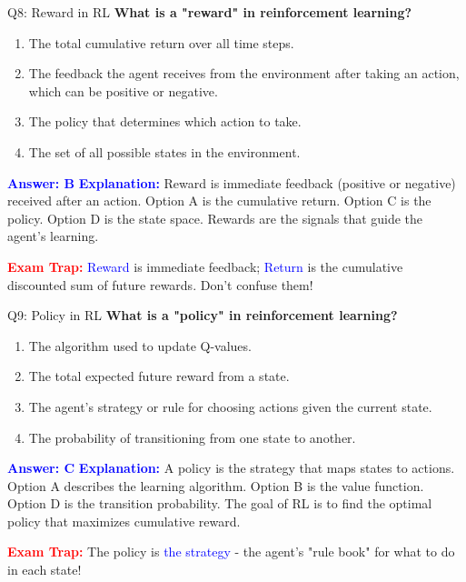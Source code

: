 \documentclass[8pt]{beamer}
\begin{document}
	\begin{frame}{Q8: Reward in RL}
		\fontsize{6.5}{7.5}\selectfont
		\textbf{What is a "reward" in reinforcement learning?}
		
		\begin{enumerate}
			\item The total cumulative return over all time steps.
			\item The feedback the agent receives from the environment after taking an action, which can be positive or negative.
			\item The policy that determines which action to take.
			\item The set of all possible states in the environment.
		\end{enumerate}
		
		\vspace{0.1cm}
		\textcolor{blue}{\textbf{Answer: B}}
		\vspace{0.1cm}
		\textcolor{blue}{\textbf{Explanation:}} Reward is immediate feedback (positive or negative) received after an action. Option A is the cumulative return. Option C is the policy. Option D is the state space. Rewards are the signals that guide the agent's learning.
		
		\textcolor{red}{\textbf{Exam Trap:}} \textcolor{blue}{Reward} is immediate feedback; \textcolor{blue}{Return} is the cumulative discounted sum of future rewards. Don't confuse them!
	\end{frame}
	
	\begin{frame}{Q9: Policy in RL}
		\fontsize{6.5}{7.5}\selectfont
		\textbf{What is a "policy" in reinforcement learning?}
		
		\begin{enumerate}
			\item The algorithm used to update Q-values.
			\item The total expected future reward from a state.
			\item The agent's strategy or rule for choosing actions given the current state.
			\item The probability of transitioning from one state to another.
		\end{enumerate}
		
		\vspace{0.1cm}
		\textcolor{blue}{\textbf{Answer: C}}
		\vspace{0.1cm}
		\textcolor{blue}{\textbf{Explanation:}} A policy is the strategy that maps states to actions. Option A describes the learning algorithm. Option B is the value function. Option D is the transition probability. The goal of RL is to find the optimal policy that maximizes cumulative reward.
		
		\textcolor{red}{\textbf{Exam Trap:}} The policy is \textcolor{blue}{the strategy} - the agent's "rule book" for what to do in each state!
	\end{frame}
	
\end{document}
